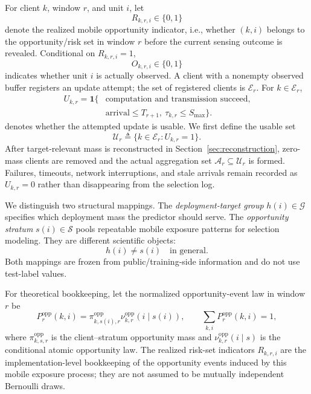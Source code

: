 \documentclass[letterpaper,journal]{IEEEtran}
\begin{document}
For client $k$, window $r$, and unit $i$, let
\begin{equation}
    R_{k,r,i}\in\{0,1\}
    \label{eq:R_indicator}
\end{equation}
denote the realized mobile opportunity indicator, i.e., whether $(k,i)$ belongs
to the opportunity/risk set in window $r$ before the current sensing outcome is
revealed.  Conditional on $R_{k,r,i}=1$,
\begin{equation}
    O_{k,r,i}\in\{0,1\}
    \label{eq:O_indicator}
\end{equation}
indicates whether unit $i$ is actually observed.  A client with a nonempty
observed buffer registers an update attempt; the set of registered clients is
$\mathcal{E}_r$.  For $k\in\mathcal{E}_r$,
\begin{equation}
\begin{aligned}
 U_{k,r}=\mathbf{1}\{&\text{computation and transmission succeed,}\\
 &\text{arrival}\le T_{r+1},\ \tau_{k,r}\le S_{\max}\}.
\end{aligned}
 \label{eq:U_indicator}
\end{equation}
denotes whether the attempted update is usable.  We first define the usable set
\begin{equation}
    \mathcal{U}_r
    \triangleq
    \{k\in\mathcal{E}_r:U_{k,r}=1\}.
    \label{eq:usable_set}
\end{equation}
After target-relevant mass is reconstructed in
Section~\ref{sec:reconstruction}, zero-mass clients are removed and the actual
aggregation set $\mathcal{A}_r\subseteq\mathcal{U}_r$ is formed.  Failures,
timeouts, network interruptions, and stale arrivals remain recorded as
$U_{k,r}=0$ rather than disappearing from the selection log.

We distinguish two structural mappings.  The \emph{deployment-target group}
$h(i)\in\mathcal{G}$ specifies which deployment mass the predictor should
serve.  The \emph{opportunity stratum} $s(i)\in\mathcal{S}$ pools repeatable
mobile exposure patterns for selection modeling.  They are different
scientific objects:
\begin{equation}
    h(i)\neq s(i)\quad\text{in general}.
    \label{eq:h_neq_s}
\end{equation}
Both mappings are frozen from public/training-side information and do not use
test-label values.

For theoretical bookkeeping, let the normalized opportunity-event law in
window $r$ be
\begin{equation}
 P_r^{\mathrm{opp}}(k,i)
 =
 \pi^{\mathrm{opp}}_{k,s(i),r}
 \nu^{\mathrm{opp}}_{k,r}(i\mid s(i)),
 \qquad
 \sum_{k,i}P_r^{\mathrm{opp}}(k,i)=1,
 \label{eq:opp_event_law}
\end{equation}
where $\pi^{\mathrm{opp}}_{k,s,r}$ is the client--stratum opportunity mass and
$\nu^{\mathrm{opp}}_{k,r}(i\mid s)$ is the conditional atomic opportunity law.
The realized risk-set indicators $R_{k,r,i}$ are the implementation-level
bookkeeping of the opportunity events induced by this mobile exposure process;
they are not assumed to be mutually independent Bernoulli draws.
\end{document}
